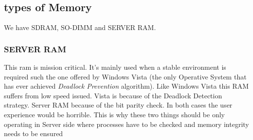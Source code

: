 \documentclass[a4paper,12pt]{article}
\begin{document}
\subsection{types of Memory}

We have SDRAM, SO-DIMM and SERVER RAM.

\subsubsection{SERVER RAM}
This ram is mission critical. It's mainly used when a stable environment is required such the one offered by Windows Vista (the only Operative System that has ever achieved \emph{Deadlock Prevention} algorithm).
Like Windows Vista this RAM suffers from low speed issued. Vista is because of the Deadlock Detection strategy. Server RAM because of the bit parity check. In both cases the user experience would be horrible. This is why these two things should be only operating in Server side where processes have to be checked and memory integrity needs to be ensured
\printindex
\end{document}
